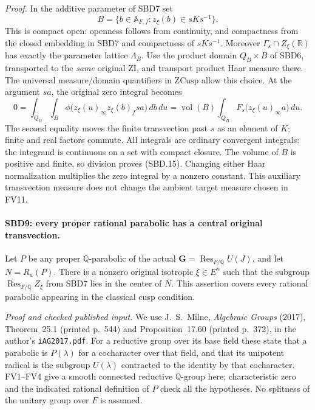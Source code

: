 \emph{Proof.}
In the additive parameter of SBD7 set
\[
 B=\{b\in\mathbb A_{F,f}:z_\xi(b)\in sKs^{-1}\}.
\]
This is compact open: openness follows from continuity, and
compactness from the closed embedding in SBD7 and compactness of
\(sKs^{-1}\).  Moreover \(\Gamma_s\cap Z_\xi(\mathbb R)\)
has exactly the parameter lattice \(\Lambda_B\).
Use the product domain \(Q_B\times B\) of SBD6, transported to
the \emph{same} original \(\mathrm{ZI}\), and transport product
Haar measure there.  The universal measure/domain quantifiers in
\(\mathrm{ZCusp}\) allow this choice.  At the argument \(sa\),
the original zero integral becomes
\[
 0=\int_{Q_B}\int_B
       \phi\bigl(z_\xi(u)_\infty z_\xi(b)_fsa\bigr)\,db\,du
   =\operatorname{vol}(B)
       \int_{Q_B}F_s\bigl(z_\xi(u)_\infty a\bigr)\,du.
 \tag{SBD.16}
\]
The second equality moves the finite transvection past \(s\)
as an element of \(K\); finite and real factors commute.
All integrals are ordinary convergent integrals: the integrand
is continuous on a set with compact closure.  The volume of
\(B\) is positive and finite, so division proves (SBD.15).
Changing either Haar normalization multiplies the zero integral
by a nonzero constant.  This auxiliary transvection measure
does not change the ambient target measure chosen in FV11.

\paragraph{SBD9: every proper rational parabolic has a central original transvection.}
\label{claim:SBD9}
Let \(P\) be any proper \(\mathbb Q\)-parabolic of the actual
\(\mathbf G=\operatorname{Res}_{F/\mathbb Q}U(J)\), and let
\(N=R_u(P)\).  There is a nonzero original isotropic
\(\xi\in E^n\) such that the subgroup
\(\operatorname{Res}_{F/\mathbb Q}Z_\xi\) from SBD7 lies in
the center of \(N\).  This assertion covers every rational
parabolic appearing in the classical cusp condition.

\emph{Proof and checked published input.}
We use J.~S.~Milne, \emph{Algebraic Groups} (2017), Theorem~25.1
(printed p.~544) and Proposition~17.60 (printed p.~372), in the
author's \texttt{i\allowbreak AG2017.\allowbreak pdf}.  For a reductive group over its
base field these state that a parabolic is \(P(\lambda)\) for a
cocharacter over that field, and that its unipotent radical is
the subgroup \(U(\lambda)\) contracted to the identity by that
cocharacter.  FV1--FV4 give a smooth connected reductive
\(\mathbb Q\)-group here; characteristic zero and the indicated
rational definition of \(P\) check all the hypotheses.  No
splitness of the unitary group over \(F\) is assumed.

